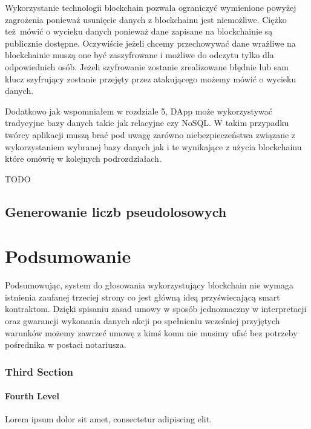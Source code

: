 \documentclass[]{llncs}
\begin{document}
  Wykorzystanie technologii blockchain pozwala ograniczyć wymienione powyżej
  zagrożenia ponieważ usunięcie danych z blockchainu jest niemożliwe. Ciężko
  też mówić o wycieku danych ponieważ dane zapisane na blockchainie są
  publicznie dostępne. Oczywiście jeżeli chcemy przechowywać dane wrażliwe na
  blockchainie muszą one być zaszyfrowane i możliwe do odczytu tylko dla
  odpowiednich osób. Jeżeli szyfrowanie zostanie zrealizowane błędnie lub sam
  klucz szyfrujący zostanie przejęty przez atakującego możemy mówić o wycieku
  danych.

  Dodatkowo jak wspomniałem w rozdziale 5, DApp może wykorzystywać tradycyjne
  bazy danych takie jak relacyjne czy NoSQL. W takim przypadku twórcy aplikacji
  muszą brać pod uwagę zarówno niebezpieczeństwa związane z wykorzystaniem
  wybranej bazy danych jak i te wynikające z użycia blockchainu które omówię w
  kolejnych podrozdziałach.

  TODO
  \cite{open-zeppelin}

\subsection{Generowanie liczb pseudolosowych}

\cite{liczby-losowe}

\section{Podsumowanie}

  Podsumowując, system do głosowania wykorzystujący blockchain nie wymaga
  istnienia zaufanej trzeciej strony co jest główną ideą przyświecającą smart
  kontraktom. Dzięki spisaniu zasad umowy w sposób jednoznaczny w interpretacji
  oraz gwarancji wykonania danych akcji po spełnieniu wcześniej przyjętych
  warunków możemy zawrzeć umowę z kimś komu nie musimy ufać bez potrzeby
  pośrednika w postaci notariusza.


\subsubsection{Third Section}
\paragraph{Fourth Level}
Lorem ipsum dolor sit amet, consectetur adipiscing elit.
\end{document}
